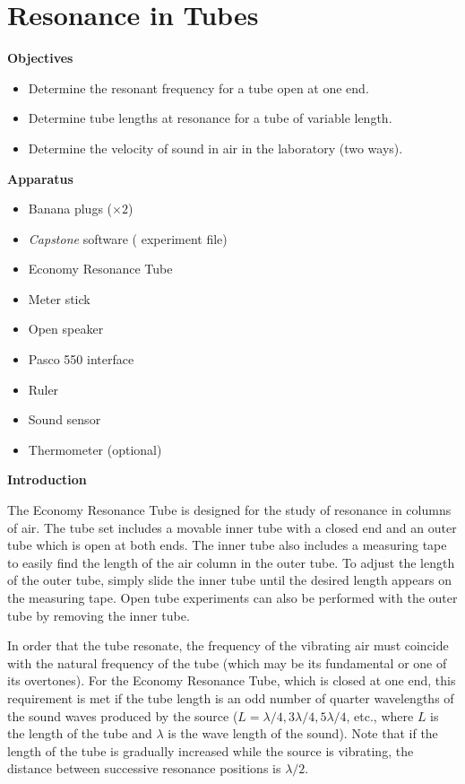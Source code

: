 \section{Resonance in Tubes}

\makelabheader %

\bigskip

\textbf{Objectives}
\begin{itemize}[nosep]
\item Determine the resonant frequency for a tube open at one end.

\item Determine tube lengths at resonance for a tube of variable length.

\item Determine the velocity of sound in air in the laboratory (two ways).

\end{itemize}

\bigskip
\textbf{Apparatus} 
\begin{itemize}[nosep]
\item Banana plugs ($\times 2$)
\item \textit{Capstone} software ( experiment file)
\item Economy Resonance Tube 
\item Meter stick
\item Open speaker
\item Pasco 550 interface
\item Ruler
\item Sound sensor
\item Thermometer (optional)
\end{itemize}
\bigskip
\textbf{Introduction} 

The Economy Resonance Tube is designed for the study of resonance in columns of air.  The tube set includes a movable inner tube with a closed end and an outer tube which is open at both ends.  The inner tube also includes a measuring tape to easily find the length of the air column in the outer tube.  To adjust the length of the outer tube, simply slide the inner tube until the desired length appears on the measuring tape.  Open tube experiments can also be performed with the outer tube by removing the inner tube.

In order that the tube resonate, the frequency of the vibrating air must coincide with the natural frequency of the tube (which may be its fundamental or one of its overtones). For the Economy Resonance Tube, which is closed at one end, this requirement is met if the tube length is an odd number of quarter wavelengths of the sound waves produced by the source ($L = \lambda/4, 3 \lambda/4, 5 \lambda/4$, etc., where $L$ is the length of the tube and $\lambda$ is the wave length of the sound). Note that if the length of the tube is gradually increased while the source is vibrating, the distance between successive resonance positions is $\lambda/2$. 

